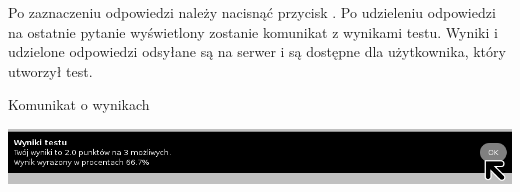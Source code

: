 \documentclass[letterpaper,10pt,polish]{sphinxmanual}
\begin{document}
Po zaznaczeniu odpowiedzi należy nacisnąć przycisk . Po udzieleniu odpowiedzi na ostatnie pytanie wyświetlony zostanie komunikat z wynikami testu. Wyniki i udzielone odpowiedzi odsyłane są na serwer i są dostępne dla użytkownika, który utworzył test.

Komunikat o wynikach

\includegraphics{Wyniki.png}



\renewcommand{\indexname}{Indeks}
\printindex
\end{document}
